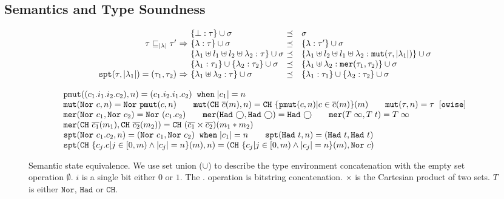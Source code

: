 \subsection{\qafny Semantics and Type Soundness}\label{sec:semantics}

\begin{figure}
{\small
\begin{center}
 \[
  \begin{array}{r@{~}c@{~}l@{~}cl}
  &&\{\bot:\tau\} \cup \sigma &\preceq& \sigma\\
  \tau\sqsubseteq_{\slen{\lambda}}\tau' &\Rightarrow& \{\lambda:\tau\} \cup \sigma &\preceq& \{\lambda:\tau'\} \cup \sigma\\
  &&\{\lambda_1\uplus l_1 \uplus l_2 \uplus \lambda_2 :\tau\} \cup \sigma &\preceq& \{\lambda_1\uplus l_2 \uplus l_1 \uplus \lambda_2 : \texttt{mut}(\tau,\slen{\lambda_1})\} \cup \sigma\\
  &&\{\lambda_1 :\tau_1\} \cup \{\lambda_2 :\tau_2\} \cup \sigma &\preceq& \{\lambda_1 \uplus \lambda_2 :\texttt{mer}(\tau_1,\tau_2)\} \cup \sigma \\
  \texttt{spt}(\tau,\slen{\lambda_1})=(\tau_1,\tau_2)&\Rightarrow&\{\lambda_1 \uplus \lambda_2 :\tau\} \cup \sigma &\preceq& \{\lambda_1 :\tau_1\} \cup \{\lambda_2 :\tau_2\} \cup \sigma
    \end{array}
  \]
\end{center}
{\footnotesize
\[
\begin{array}{l}
\texttt{pmut}((c_1.i_1.i_2.c_2),n)=(c_1.i_2.i_1.c_2) \;\;\texttt{when}\;|c_1|=n
\\
\texttt{mut}(\texttt{Nor}~{c},n)=\texttt{Nor}~{\texttt{pmut}(c,n)}
\qquad
\texttt{mut}(\texttt{CH}~{\overline{c}(m)},n)=\texttt{CH}~{\{\texttt{pmut}(c,n)|c\in\overline{c}(m)\}(m)}
\qquad
\texttt{mut}(\tau,n)=\tau\;\;[\texttt{owise}]
\\
\texttt{mer}(\texttt{Nor}~{c_1},\texttt{Nor}~{c_2})=\texttt{Nor}~{(c_1.c_2)}
\qquad
\texttt{mer}(\texttt{Had}~{\bigcirc},\texttt{Had}~{\bigcirc})=\texttt{Had}~{\bigcirc}
\qquad
\texttt{mer}(T\;\infty,T\;t)=T\;\infty
\\
\texttt{mer}(\texttt{CH}~{\overline{c_1}(m_1)},\texttt{CH}~{\overline{c_2}(m_2)})=\texttt{CH}~{(\overline{c_1}\times \overline{c_2})(m_1*m_2)}
\\
\texttt{spt}(\texttt{Nor}~{c_1.c_2},n)=(\texttt{Nor}~{c_1},\texttt{Nor}~{c_2}) \;\;\texttt{when}\;|c_1|=n
\qquad
\texttt{spt}(\texttt{Had}~{t},n)=(\texttt{Had}~{t},\texttt{Had}~{t})
\\
\texttt{spt}(\texttt{CH}~{\{c_j.c|j\in [0,m)\wedge |c_j|=n\}(m)},n)=(\texttt{CH}~{\{c_j|j\in [0,m)\wedge |c_j|=n\}(m)},\texttt{Nor}~{c})
\end{array}
\]
}
\caption{Semantic state equivalence. We use set union ($\cup$) to describe the type environment concatenation with the empty set operation $\emptyset$. $i$ is a single bit either $0$ or $1$. The $.$ operation is bitstring concatenation. $\times$ is the Cartesian product of two sets.
$T$ is either $\texttt{Nor}$, $\texttt{Had}$ or $\texttt{CH}$. }
  \label{fig:state-equiv}
}
\end{figure}

